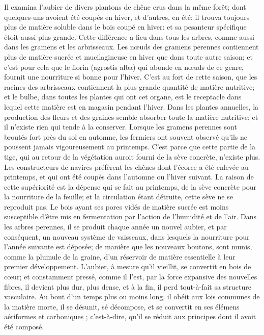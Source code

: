 Il examina l'aubier de divers plantons de chêne crus dans la même forêt; dont quelques-uns avoient été coupés en hiver, et d'autres, en été: il trouva toujours plus de matière soluble dans le bois coupé en hiver:\setcounter{page}{105} et sa pesanteur spécifique étoit aussi plus grande.
Cette différence a lieu dans tous les arbres, comme aussi dans les gramens et les arbrisseaux. Les nœuds des gramens perennes contiennent plus de matière sucrée et mucilagineuse en hiver que dans toute autre saison; et c'est pour cela que le fiorin (agrostis alba) qui abonde en nœuds de ce genre, fournit une nourriture si bonne pour l'hiver.
C'est au fort de cette saison, que les racines des arbrisseaux contiennent la plus grande quantité de matière nutritive; et le bulbe, dans toutes les plantes qui ont cet organe, est le receptacle dans lequel cette matière est en magasin pendant l'hiver.
Dans les plantes annuelles, la production des fleurs et des graines semble absorber toute la matière nutritive; et il n'existe rien qui tende à la conserver.
Lorsque les gramens perennes sont broutés fort près du sol en automne, les fermiers ont souvent observé qu'ils ne poussent jamais vigoureusement au printemps. C'est parce que cette partie de la tige, qui au retour de la végétation auroit fourni de la sève concrète, n'existe plus.
\setcounter{page}{106} Les constructeurs de navires préfèrent les chênes dont l’écorce a été enlevée au printemps, et qui ont été coupés dans l’automne ou l’hiver suivant. La raison de cette supériorité est la dépense qui se fait au printemps, de la sève concrète pour la nourriture de la feuille; et la circulation étant détruite, cette sève ne se reproduit pas. Le bois ayant ses pores vidés de matière sucrée est moins susceptible d’être mis en fermentation par l’action de l’humidité et de l’air.
Dans les arbres perennes, il se produit chaque année un nouvel aubier, et par conséquent, un nouveau système de vaisseaux, dans lesquels la nourriture pour l’année suivante est déposée; de manière que les nouveaux boutons, sont munis, comme la plumule de la graine, d’un réservoir de matière essentielle à leur premier développement.
L’aubier, à mesure qu’il vieillit, se convertit en bois de cœur; et constamment pressé, comme il l’est, par la force expansive des nouvelles fibres, il devient plus dur, plus dense, et à la fin, il perd tout-à-fait sa structure vasculaire. Au bout d’un temps plus ou moins long, il obéit aux lois communes de la matière morte, il se désunit,\setcounter{page}{107} sé décompose, et se convertit en ses élémens aériformes et carboniques ; c'est-à-dire, qu'il se réduit aux principes dont il avoit été composé.

